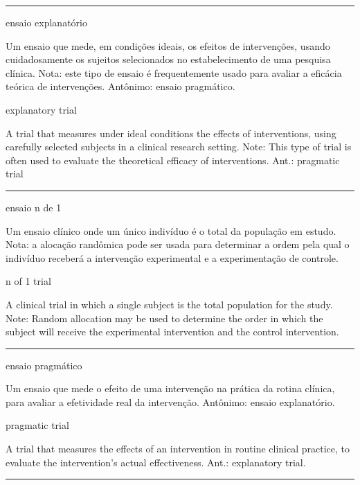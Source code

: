 \documentclass[
]{book}
\begin{document}
\begin{center}\rule{0.5\linewidth}{0.5pt}\end{center}

ensaio explanatório

Um ensaio que mede, em condições ideais, os efeitos de intervenções, usando cuidadosamente os sujeitos selecionados no estabelecimento de uma pesquisa clínica. Nota: este tipo de ensaio é frequentemente usado para avaliar a eficácia teórica de intervenções. Antônimo: ensaio pragmático.

explanatory trial

A trial that measures under ideal conditions the effects of interventions, using carefully selected subjects in a clinical research setting. Note: This type of trial is often used to evaluate the theoretical efficacy of interventions. Ant.: pragmatic trial

\begin{center}\rule{0.5\linewidth}{0.5pt}\end{center}

ensaio n de 1

Um ensaio clínico onde um único indivíduo é o total da população em estudo. Nota: a alocação randômica pode ser usada para determinar a ordem pela qual o indivíduo receberá a intervenção experimental e a experimentação de controle.

n of 1 trial

A clinical trial in which a single subject is the total population for the study. Note: Random allocation may be used to determine the order in which the subject will receive the experimental intervention and the control intervention.

\begin{center}\rule{0.5\linewidth}{0.5pt}\end{center}

ensaio pragmático

Um ensaio que mede o efeito de uma intervenção na prática da rotina clínica, para avaliar a efetividade real da intervenção. Antônimo: ensaio explanatório.

pragmatic trial

A trial that measures the effects of an intervention in routine clinical practice, to evaluate the intervention's actual effectiveness. Ant.: explanatory trial.

\begin{center}\rule{0.5\linewidth}{0.5pt}\end{center}
\end{document}
